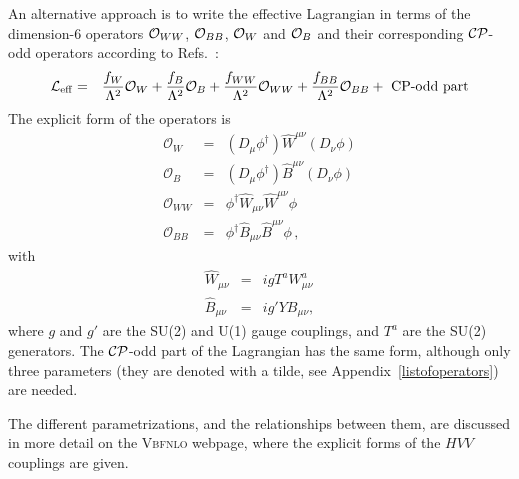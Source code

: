 \documentclass[english,12pt]{article}
\begin{document}
An alternative approach is to write the effective Lagrangian in terms of the dimension-6 operators ${\cal O}_{WW}$,  ${\cal O}_{BB}$, ${\cal O}_W$ 
and ${\cal O}_B$ and their corresponding $\cal{CP}$-odd 
operators according to Refs.~\cite{Hagiwara:1993qt,Hagiwara:1993ck}:
%
\begin{eqnarray}
\label{eq:HVV_F}
 \mathcal{L}_{\rm eff} &=& \frac{f_{W}}{\Lambda^{2}} \mathcal{O}_{W}+ \frac{f_{B}}{\Lambda^{2}} \mathcal{O}_{B} + \frac{f_{WW}}{\Lambda^{2}} \mathcal{O}_{WW} + \frac{f_{BB}}{\Lambda^{2}} \mathcal{O}_{BB} + \mbox{ CP-odd part}
\end{eqnarray}
%
The explicit form of the operators is %
\begin{eqnarray}
\label{eq:operators}
\mathcal{O}_{W} &=& (D_{\mu} \phi^{\dagger}) \widehat{W}^{\mu \nu} (D_{\nu} \phi) \nonumber \\
\mathcal{O}_{B} &=& (D_{\mu} \phi^{\dagger}) \widehat{B}^{\mu \nu} (D_{\nu} \phi) \nonumber \\
\mathcal{O}_{WW} &=& \phi^{\dagger} \widehat{W}_{\mu\nu} \widehat{W}^{\mu\nu} \phi \nonumber \\
\mathcal{O}_{BB} &=& \phi^{\dagger} \widehat{B}_{\mu\nu} \widehat{B}^{\mu\nu} \phi \,,%
\end{eqnarray}
%
with
\begin{eqnarray}
 \widehat{W}_{\mu\nu} &=& i g T^{a} W^{a}_{\mu\nu} \nonumber \\
 \widehat{B}_{\mu\nu} &=& i g' Y B_{\mu \nu},
\end{eqnarray}
%
where $g$ and $g'$ are the SU(2) and U(1) gauge couplings, and $T^{a}$ are the
SU(2) generators.  The $\cal{CP}$-odd part of the Lagrangian has the same form, although
only three parameters (they are denoted with a tilde, see Appendix~\ref{listofoperators}) are needed. 

The different parametrizations, and the relationships between them, are discussed in more detail on the \textsc{Vbfnlo} webpage, where the explicit forms of the $HVV$ couplings are given.
\end{document}
